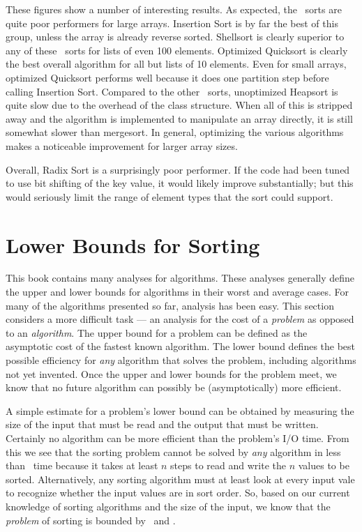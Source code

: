 These figures show a number of interesting results.
As expected, the \Ontwo\ sorts are quite poor performers for large
arrays.
Insertion Sort is by far the best of this group, unless the array is
already reverse sorted.
Shellsort is clearly superior to any of these \Ontwo\ sorts for lists
of even 100 elements.
Optimized Quicksort is clearly the best overall algorithm for all but
lists of 10 elements.
Even for small arrays, optimized Quicksort performs well because
it does one partition step before calling Insertion Sort.
Compared to the other \Onlogn\ sorts, unoptimized Heapsort is quite
slow due to the overhead of the class structure.
When all of this is stripped away and the algorithm is implemented to
manipulate an array directly, it is still somewhat slower than
mergesort.
In general, optimizing the various algorithms makes a
noticeable improvement for larger array sizes.

Overall, Radix Sort is a surprisingly poor performer.
If the code had been tuned to use bit shifting of the key value, it
would likely improve substantially;
but this would seriously limit the range of element types that the
sort could support.

\section{Lower Bounds for Sorting}
\label{LBSort}

This book contains many analyses for algorithms.
These analyses generally define the upper and lower bounds for
algorithms in their worst and average cases.
For many of the algorithms presented so far, analysis has been easy.
This section considers a more difficult task --- an analysis for the
cost of a \emph{problem} as opposed to an \emph{algorithm}.
The upper bound for a problem can be defined as the asymptotic cost of
the fastest known algorithm.
The lower bound defines the best possible efficiency for \emph{any}
algorithm that solves the problem, including algorithms not yet
invented.
Once the upper and lower bounds for the problem meet, we know that no
future algorithm can possibly be (asymptotically) more efficient.

A simple estimate for a problem's lower bound can be obtained by
measuring the size of the input that must be read and the output
that must be written.
Certainly no algorithm can be more efficient than the problem's
I/O time.
From this we see that the sorting problem cannot be solved by
\emph{any} algorithm in less than \Omegan\ time because it takes at
least \(n\) steps to read and write the \(n\) values to be sorted.
Alternatively, any sorting algorithm must at least look at every input
vale to recognize whether the input values are in sort order.
So, based on our current knowledge of sorting algorithms and the
size of the input, we know that the \emph{problem} of sorting is
bounded by \Omegan\ and \Onlogn.

